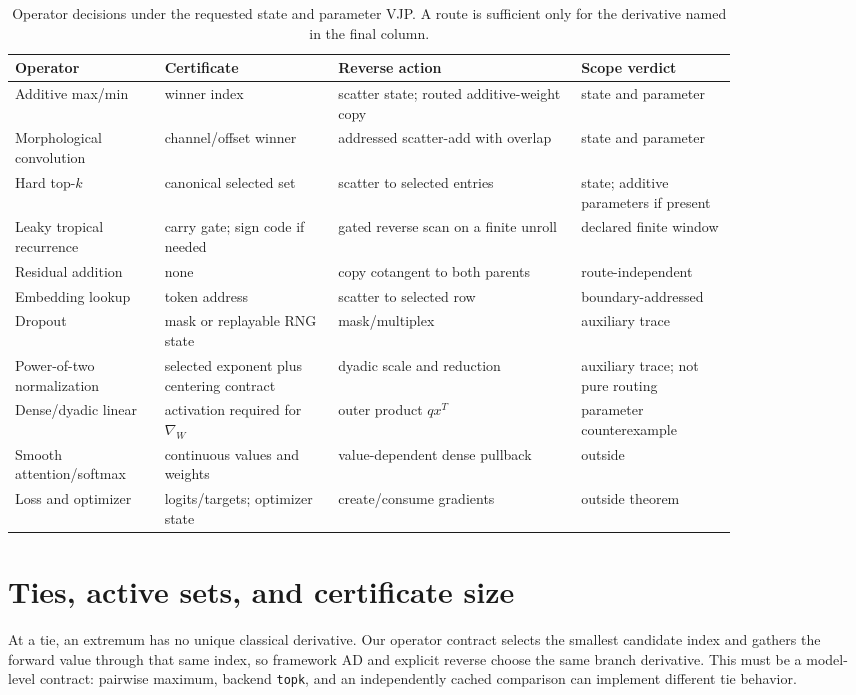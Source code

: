 \documentclass[10pt]{article}
\newcommand{\code}[1]{\texttt{#1}}
\begin{document}
\begin{table}[t]
\centering
\caption{Operator decisions under the requested state and parameter VJP.  A
route is sufficient only for the derivative named in the final column.}
\label{tab:operators}
\small
\begin{tabular}{p{0.17\linewidth}p{0.20\linewidth}p{0.29\linewidth}p{0.18\linewidth}}
\toprule
Operator & Certificate & Reverse action & Scope verdict \\
\midrule
Additive max/min & winner index & scatter state; routed additive-weight copy & state and parameter \\
Morphological convolution & channel/offset winner & addressed scatter-add with overlap & state and parameter \\
Hard top-$k$ & canonical selected set & scatter to selected entries & state; additive parameters if present \\
Leaky tropical recurrence & carry gate; sign code if needed & gated reverse scan on a finite unroll & declared finite window \\
Residual addition & none & copy cotangent to both parents & route-independent \\
Embedding lookup & token address & scatter to selected row & boundary-addressed \\
Dropout & mask or replayable RNG state & mask/multiplex & auxiliary trace \\
Power-of-two normalization & selected exponent plus centering contract & dyadic scale and reduction & auxiliary trace; not pure routing \\
Dense/dyadic linear & activation required for $\nabla_W$ & outer product $qx^T$ & parameter counterexample \\
Smooth attention/softmax & continuous values and weights & value-dependent dense pullback & outside \\
Loss and optimizer & logits/targets; optimizer state & create/consume gradients & outside theorem \\
\bottomrule
\end{tabular}
\end{table}

\section{Ties, active sets, and certificate size}

At a tie, an extremum has no unique classical derivative.  Our operator
contract selects the smallest candidate index and gathers the forward value
through that same index, so framework AD and explicit reverse choose the same
branch derivative.  This must be a model-level contract: pairwise maximum,
backend \code{topk}, and an independently cached comparison can implement
different tie behavior.
\end{document}
